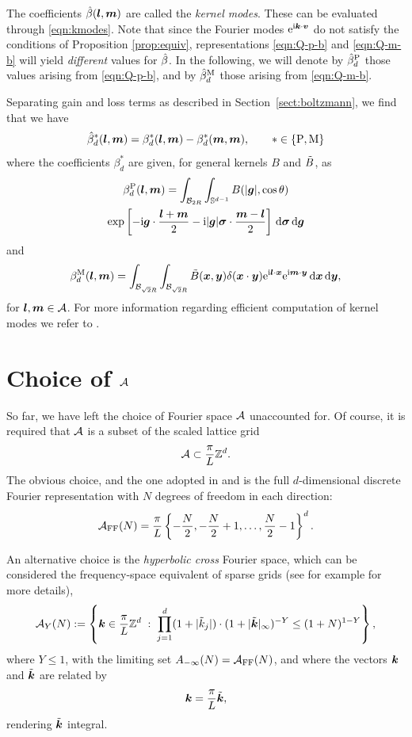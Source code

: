 The coefficients $\hat{\beta}({\bm l},{\bm m})$ are called the {\em kernel modes}. These can be
evaluated through \eqref{eqn:kmodes}.  Note that since the Fourier modes
$\mathrm{e}^{\mathrm{i}{\bm k}\cdot {\bm v}}$ do not satisfy the conditions of Proposition
\ref{prop:equiv}, representations \eqref{eqn:Q-p-b} and \eqref{eqn:Q-m-b} will
yield {\em different} values for $\hat{\beta}$. In the following, we will denote by
$\hat{\beta}_d^{\mathrm{P}}$ those values arising from \eqref{eqn:Q-p-b}, and by $\hat{\beta}_d^{\mathrm{M}}$ those
arising from \eqref{eqn:Q-m-b}. 

Separating gain and loss terms as described in Section~\ref{sect:boltzmann}, we
find that we have 
\[ 
    \hat{\beta}_d^\ast({\bm l},{\bm m}) = \beta_d^\ast({\bm l},{\bm m}) - \beta_d^\ast({\bm m},{\bm m}),\qquad
    \ast \in \{\mathrm{P},\mathrm{M}\}
\]
where the coefficients $\beta_d^\ast$ are given, for general kernels $B$ and $\tilde{B}$, as 
\begin{multline} \label{eqn:B-p} 
    \beta_d^{\mathrm{P}}({\bm l},{\bm m}) = \int_{\mathcal{B}_{2R}}\int_{\mathbb{S}^{d-1}} B(|{\bm g}|,\cos\theta) \\
    \exp\left[ -\mathrm{i}{\bm g}\cdot\frac{{\bm l}+{\bm m}}{2} - 
        \mathrm{i}|{\bm g}|{\bm\sigma}\cdot\frac{{\bm m}-{\bm l}}{2} \right] \,\mathrm{d}{\bm\sigma} \,\mathrm{d} {\bm g}
\end{multline}
and
\begin{equation} \label{eqn:B-m} 
    \beta_d^{\mathrm{M}}({\bm l},{\bm m}) = \int_{\mathcal{B}_{\sqrt{2}R}}\int_{\mathcal{B}_{\sqrt{2}R}} 
        \tilde{B}({\bm x},{\bm y})\delta({\bm x}\cdot {\bm y}) \mathrm{e}^{\mathrm{i}{\bm l}\cdot {\bm x}} 
        \mathrm{e}^{\mathrm{i}{\bm m}\cdot {\bm y}} \,\mathrm{d} {\bm x} \,\mathrm{d} {\bm y},
\end{equation}
for ${\bm l},{\bm m}\in\mathcal{A}$. For more information regarding efficient computation of kernel modes we refer to
\cite{Pareschi2000nsb,Mouhot2006fac}.

\section{Choice of $\mathcal{A}$} \label{sec:hyper}

So far, we have left the choice of Fourier space $\mathcal{A}$ unaccounted for. Of
course, it is required that $\mathcal{A}$ is a subset of the scaled lattice grid
\[ 
    \mathcal{A} \subset \frac{\pi}{L}\mathbb{Z}^d. 
\]
The obvious choice, and the one adopted in \cite{Pareschi2000nsb} and
\cite{Mouhot2006fac} is the full $d$-dimensional discrete Fourier
representation with $N$ degrees of freedom in each direction:
\[
    \mathcal{A}_\text{FF}(N) = \frac{\pi}{L}\left\{-\frac{N}{2}, -\frac{N}{2}+1, \ldots, 
            \frac{N}{2}-1\right\}^d.
\]

An alternative choice is the {\em hyperbolic cross} Fourier space, which can be
considered the frequency-space equivalent of sparse grids (see for example
\cite{Gradinaru2007fts,Knapek2000hca,Griebel2013fdf} for more details),
\[
    \mathcal{A}_Y(N):= \left\{ {\bm k}\in \frac{\pi}{L}\mathbb{Z}^d \;:\; \prod_{j=1}^d(1+|\tilde{k}_j|)
            \cdot (1+|\tilde{{\bm k}}|_\infty)^{-Y} \le (1+N)^{1-Y} \right\},
\]
where $Y\leq1$, with the limiting set $A_{-\infty}(N) = \mathcal{A}_\text{FF}(N)$, and where the
vectors ${\bm k}$ and $\tilde{{\bm k}}$ are related by
\[
    {\bm k} = \frac{\pi}{L}\tilde{{\bm k}},
\]
rendering $\tilde{{\bm k}}$ integral. 

